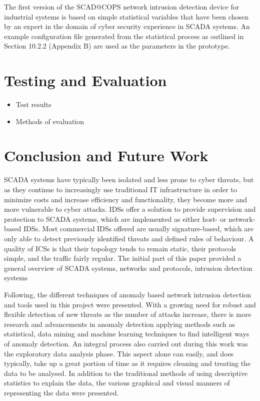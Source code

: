 \documentclass[12pt,]{article}
\begin{document}
The first version of the SCAD@COPS network intrusion detection device
for industrial systems is based on simple statistical variables that
have been chosen by an expert in the domain of cyber security experience
in SCADA systems. An example configuration file generated from the
statistical process as outlined in Section 10.2.2 (Appendix B) are used
as the parameters in the prototype.

\pagebreak

\section{Testing and Evaluation}\label{testing-and-evaluation}

\begin{itemize}
\itemsep1pt\parskip0pt
\item
  Test results\\
\item
  Methods of evaluation
\end{itemize}

\pagebreak

\section{Conclusion and Future Work}\label{conclusion-and-future-work}

SCADA systems have typically been isolated and less prone to cyber
threats, but as they continue to increasingly use traditional IT
infrastructure in order to minimize costs and increase efficiency and
functionality, they become more and more vulnerable to cyber attacks.
IDSs offer a solution to provide supervision and protection to SCADA
systems, which are implemented as either host- or network-based IDSs.
Most commercial IDSs offered are usually signature-based, which are only
able to detect previously identified threats and defined rules of
behaviour. A quality of ICSs is that their topology tends to remain
static, their protocols simple, and the traffic fairly regular. The
initial part of this paper provided a general overview of SCADA systems,
networks and protocols, intrusion detection systems

Following, the different techniques of anomaly based network intrusion
detection and tools used in this project were presented. With a growing
need for robust and flexible detection of new threats as the number of
attacks increase, there is more research and advancements in anomaly
detection applying methods such as statistical, data mining and machine
learning techniques to find intelligent ways of anomaly detection. An
integral process also carried out during this work was the exploratory
data analysis phase. This aspect alone can easily, and does typically,
take up a great portion of time as it requires cleaning and treating the
data to be analysed. In addition to the traditional methods of using
descriptive statistics to explain the data, the various graphical and
visual manners of representing the data were presented.
\end{document}
